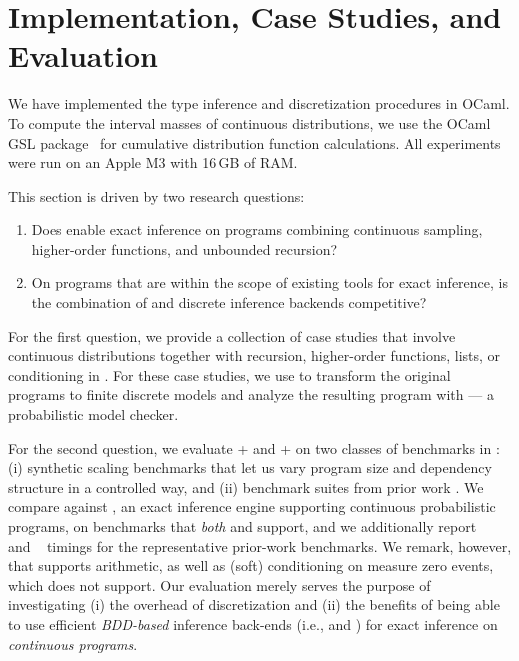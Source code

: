 \section{Implementation, Case Studies, and Evaluation}\label{sec:implem_eval}

We have implemented the \Slice{} type inference and discretization procedures in OCaml. To compute the interval masses of continuous distributions, we use the OCaml GSL package~\cite{gsl} for cumulative distribution function calculations. All experiments were run on an Apple M3 with 16\,GB of RAM.

This section is driven by two research questions:
%
\begin{enumerate}
    \item Does \Slice{} enable exact inference on programs combining continuous sampling, higher-order functions, and unbounded recursion?
    \item On programs that are within the scope of existing tools for exact inference, is the combination of \Slice{} and discrete inference backends competitive? 
\end{enumerate}

For the first question, we provide a collection of case studies that involve continuous distributions together with recursion, higher-order functions, lists, or conditioning in . For these case studies, we use \Slice{} to transform the original programs to finite discrete models and analyze the resulting program with \Storm{} \cite{storm} --- a probabilistic model checker.

For the second question, we evaluate \Slice{}+\Dice{} and \Slice{}+\Roulette{} on two classes of benchmarks in : (i) synthetic scaling benchmarks that let us vary program size and dependency structure in a controlled way, and (ii) benchmark suites from prior work \cite{Saad2021SPPL,gehr2016psi}. We compare against \SPPL \cite{Saad2021SPPL}, an exact inference engine supporting continuous probabilistic programs, on benchmarks that \emph{both} \Slice and \SPPL support, and we additionally report \PSI{}~\cite{gehr2016psi} and \Hakaru{}~\cite{Narayanan2016Hakaru} timings for the representative prior-work benchmarks. We remark, however, that \SPPL supports arithmetic, as well as (soft) conditioning on measure zero events, which \Slice does not support. Our evaluation merely serves the purpose of investigating (i) the overhead of discretization and (ii) the benefits of being able to use efficient \emph{BDD-based} inference back-ends (i.e., \Dice and \Roulette) for exact inference on \emph{continuous programs}.

